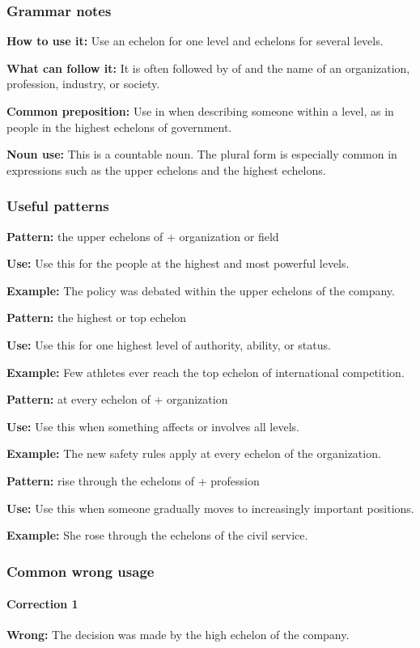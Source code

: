 \documentclass[11pt]{article}
\begin{document}
\subsubsection{Grammar notes}
\textbf{How to use it:} Use an echelon for one level and echelons for several levels.

\textbf{What can follow it:} It is often followed by of and the name of an organization, profession, industry, or society.

\textbf{Common preposition:} Use in when describing someone within a level, as in people in the highest echelons of government.

\textbf{Noun use:} This is a countable noun. The plural form is especially common in expressions such as the upper echelons and the highest echelons.

\subsubsection{Useful patterns}
\textbf{Pattern:} the upper echelons of + organization or field

\textbf{Use:} Use this for the people at the highest and most powerful levels.

\textbf{Example:} The policy was debated within the upper echelons of the company.

\textbf{Pattern:} the highest or top echelon

\textbf{Use:} Use this for one highest level of authority, ability, or status.

\textbf{Example:} Few athletes ever reach the top echelon of international competition.

\textbf{Pattern:} at every echelon of + organization

\textbf{Use:} Use this when something affects or involves all levels.

\textbf{Example:} The new safety rules apply at every echelon of the organization.

\textbf{Pattern:} rise through the echelons of + profession

\textbf{Use:} Use this when someone gradually moves to increasingly important positions.

\textbf{Example:} She rose through the echelons of the civil service.

\subsubsection{Common wrong usage}
\paragraph{Correction 1}
\textbf{Wrong:} The decision was made by the high echelon of the company.
\end{document}

